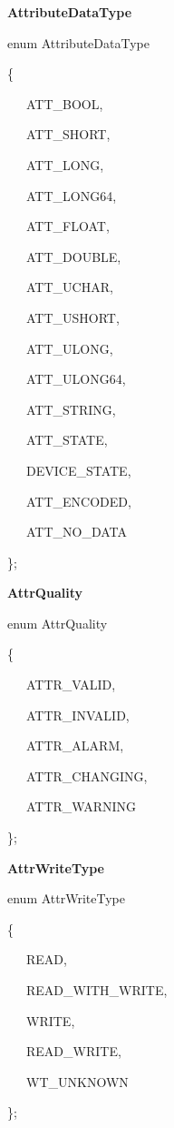 \begin{flushleft}
\textbf{AttributeDataType}
\par\end{flushleft}

enum AttributeDataType

\{

~~~ATT\_BOOL,

~~~ATT\_SHORT,

~~~ATT\_LONG,

~~~ATT\_LONG64,

~~~ATT\_FLOAT,

~~~ATT\_DOUBLE,

~~~ATT\_UCHAR,

~~~ATT\_USHORT,

~~~ATT\_ULONG,

~~~ATT\_ULONG64,

~~~ATT\_STRING,

~~~ATT\_STATE,

~~~DEVICE\_STATE,

~~~ATT\_ENCODED,

~~~ATT\_NO\_DATA

\};\\

\begin{flushleft}
\textbf{AttrQuality}
\par\end{flushleft}

enum AttrQuality

\{

~~~ATTR\_VALID,

~~~ATTR\_INVALID,

~~~ATTR\_ALARM,

~~~ATTR\_CHANGING,

~~~ATTR\_WARNING

\};\\

\begin{flushleft}
\textbf{AttrWriteType}
\par\end{flushleft}

enum AttrWriteType

\{

~~~READ,

~~~READ\_WITH\_WRITE,

~~~WRITE,

~~~READ\_WRITE,

~~~WT\_UNKNOWN

\};\\

